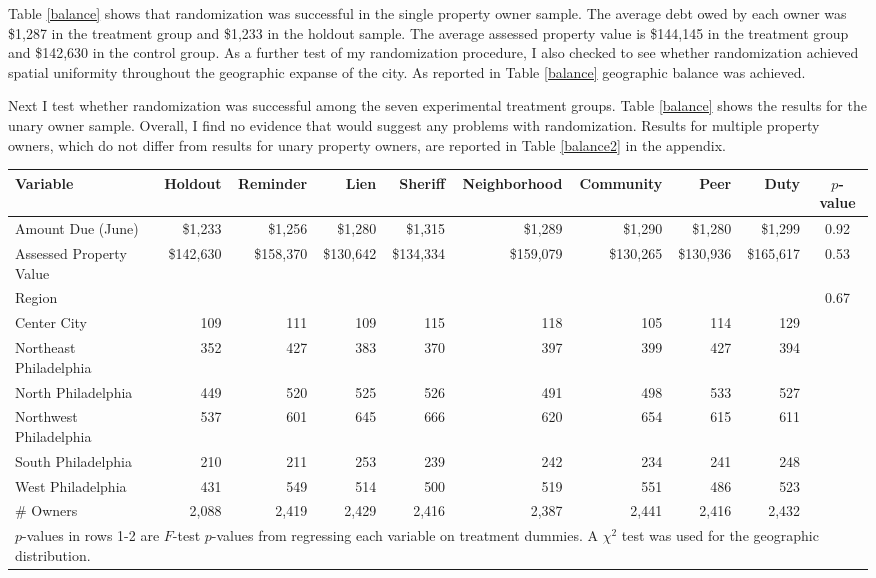 Table \ref{balance} shows that randomization was successful in the
single property owner sample.  The average debt owed by each owner was \$1,287
in the treatment group and \$1,233 in the holdout sample. The average
assessed property value is \$144,145 in the treatment group and
\$142,630 in the control group. As a further test of my randomization
procedure, I also checked to see whether randomization achieved
spatial uniformity throughout the geographic expanse of the city. As
reported in Table \ref{balance} geographic balance was achieved.

Next I test whether randomization was successful among the seven
experimental treatment groups. Table \ref{balance} shows the results
for the unary owner sample. Overall, I find no evidence that would
suggest any problems with randomization. Results for multiple property
owners, which do not differ from results for unary property owners,
are reported in Table \ref{balance2} in the appendix.

\begin{sidewaystable}[htbp]
\centering
\caption{Balance on Observables (Single Property Owners)}
\label{balance}
\vspace{10mm}
\begin{tabular}{lrrrrrrrrc}
\hline
  \hline
Variable & Holdout & Reminder & Lien & Sheriff & Neighborhood & Community & Peer & Duty & $p$-value \\ 
   \hline
Amount Due (June) & \$1,233 & \$1,256 & \$1,280 & \$1,315 & \$1,289 & \$1,290 & \$1,280 & \$1,299 & 0.92 \\ 
  Assessed Property Value & \$142,630 & \$158,370 & \$130,642 & \$134,334 & \$159,079 & \$130,265 & \$130,936 & \$165,617 & 0.53 \\ 
   \hline
  Region & & & & & & & & & 0.67 \\
  \enskip Center City & 109 & 111 & 109 & 115 & 118 & 105 & 114 & 129 & \\ 
  \enskip Northeast Philadelphia & 352 & 427 & 383 & 370 & 397 & 399 & 427 & 394 &  \\ 
  \enskip North Philadelphia & 449 & 520 & 525 & 526 & 491 & 498 & 533 & 527 &  \\ 
  \enskip Northwest Philadelphia & 537 & 601 & 645 & 666 & 620 & 654 & 615 & 611 &  \\ 
  \enskip South Philadelphia & 210 & 211 & 253 & 239 & 242 & 234 & 241 & 248 &  \\ 
  \enskip West Philadelphia & 431 & 549 & 514 & 500 & 519 & 551 & 486 & 523 &  \\ 
   \hline
\# Owners & 2,088 & 2,419 & 2,429 & 2,416 & 2,387 & 2,441 & 2,416 & 2,432 &  \\ 
  \hline

\multicolumn{10}{l}{\scriptsize{$p$-values in rows 1-2 are $F$-test
    $p$-values from regressing each variable on treatment dummies. A
    $\chi^2$ test was used for the geographic distribution.}} \\
\end{tabular}
\end{sidewaystable}
